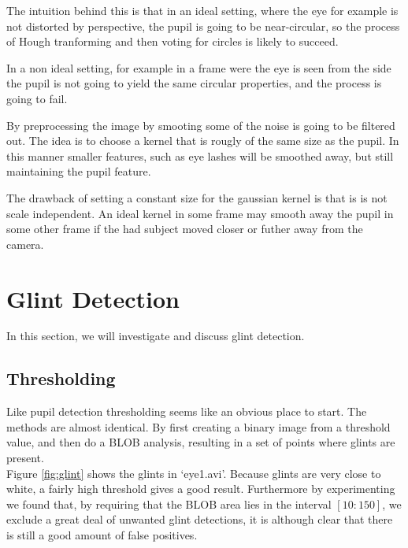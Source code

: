 \documentclass[a4paper,11pt]{article}
\begin{document}
The intuition behind this is that in an ideal setting, where the eye for example is not distorted by perspective, the pupil is going to be near-circular, so the process of Hough tranforming and then voting for circles is likely to succeed.

In a non ideal setting, for example in a frame were the eye is seen from the side the pupil is not going to yield the same circular properties, and the process is going to fail.

By preprocessing the image by smooting some of the noise is going to be filtered out. The idea is to choose a kernel that is rougly of the same size as the pupil. In this manner smaller features, such as eye lashes will be smoothed away, but still maintaining the pupil feature.

The drawback of setting a constant size for the gaussian kernel is that is is not scale independent. An ideal kernel in some frame may smooth away the pupil in some other frame if the had subject moved closer or futher away from the camera.



\section{Glint Detection}
In this section, we will investigate and discuss glint detection.

\subsection{Thresholding}
Like pupil detection thresholding seems like an obvious place to start. The methods are almost identical. By first creating a binary image from a threshold value, and then do a BLOB analysis, resulting  in a set of points where glints are present.\\

Figure \ref{fig:glint} shows the glints in ‘eye1.avi’. Because glints are very close to white, a fairly high threshold gives a good result. Furthermore by experimenting we found that, by requiring that the BLOB area lies in the interval $[10:150]$, we exclude a great deal of unwanted glint detections, it is although clear that there is still a good amount of false positives.
\end{document}
